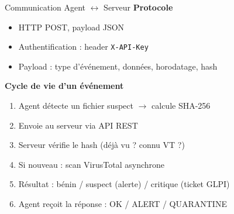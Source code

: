 \documentclass[xcolor=dvipsnames, aspectratio=169, 10pt]{beamer}
\newcommand{\bitem}{\item[$\bullet$]}
\begin{document}
\begin{frame}{Communication Agent $\leftrightarrow$ Serveur}
  \textbf{Protocole}
  \begin{itemize}
    \bitem HTTP POST, payload JSON
    \bitem Authentification : header \texttt{X-API-Key}
    \bitem Payload : type d'événement, données, horodatage, hash
  \end{itemize}
  \vspace{0.3cm}
  \textbf{Cycle de vie d'un événement}
  \begin{enumerate}
    \item Agent détecte un fichier suspect $\rightarrow$ calcule SHA-256
    \item Envoie au serveur via API REST
    \item Serveur vérifie le hash (déjà vu ? connu VT ?)
    \item Si nouveau : scan VirusTotal asynchrone
    \item Résultat : bénin / suspect (alerte) / critique (ticket GLPI)
    \item Agent reçoit la réponse : OK / ALERT / QUARANTINE
  \end{enumerate}
\end{frame}
\end{document}
